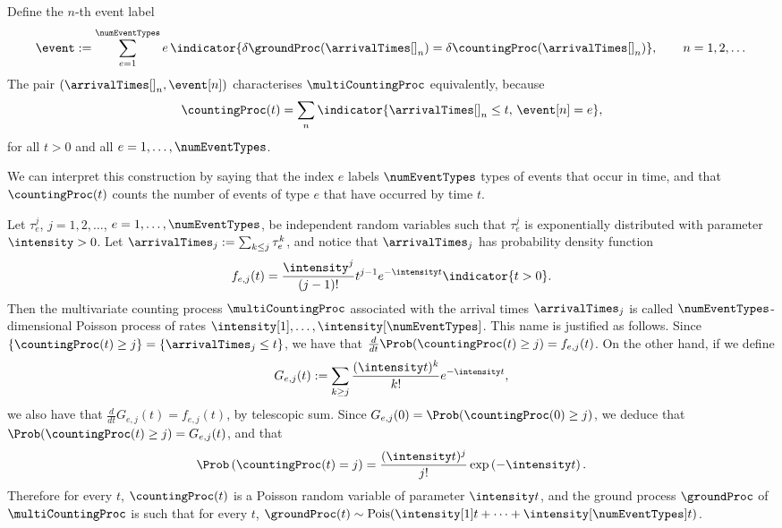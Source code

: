 Define the $n$-th event label
\begin{equation}
 \label{eq.eventLabels}
 \event := \sum_{e=1}^{\numEventTypes} e \,
 \indicator{\delta \groundProc(\arrivalTimes[ ]_{n}) = \delta\countingProc(\arrivalTimes[ ]_{n})},
 \qquad n = 1, 2, \dots
\end{equation}
The pair $(\arrivalTimes[ ]_{n}, \event[n])$ characterises $\multiCountingProc$ equivalently,
because
\begin{equation}\label{eq.NTE_counting_proc}
 \countingProc(t) = \sum_{n} \indicator{\arrivalTimes[ ]_{n}\leq t, \, \event[n] = e},
\end{equation}
for all $t>0$ and all $e = 1,\dots, \numEventTypes$.

We can interpret this construction by saying that the index $e$ labels $\numEventTypes$ types
of events that occur in time,
and that $\countingProc(t)$ counts the number of events of type $e$ that have occurred by time $t$.

\begin{example}
 Let $\tau_e^j$, $j = 1,2,\dots$, $e = 1,\dots, \numEventTypes$, be independent random variables
 such that $\tau_e^j$ is exponentially distributed with parameter $\intensity>0$.
 Let $\arrivalTimes_{j} := \sum_{k\leq j} \tau_e^{k}$,
 and notice that $\arrivalTimes_{j}$ has probability density function
 \begin{equation*}
  f_{e,j}(t) = \frac{\intensity^j}{(j-1)!}t^{j-1} e^{-\intensity t} \indicator{t>0}.
 \end{equation*}
 Then the multivariate counting process $\multiCountingProc$ associated with the arrival times
 $\arrivalTimes_{j}$ is called $\numEventTypes$-dimensional Poisson process of rates
 $\intensity[1], \dots, \intensity[\numEventTypes]$.
 This name is justified as follows.
 Since $\lbrace \countingProc(t)\geq j\rbrace = \lbrace \arrivalTimes_{j} \leq t\rbrace$,
 we have that $\frac{d}{dt} \Prob(\countingProc(t) \geq j) = f_{e,j} (t)$.
 On the other hand, if we define
 \begin{equation*}
  G_{e,j}(t) := \sum_{k\geq j} \frac{(\intensity t)^k}{k!}e^{-\intensity t},
 \end{equation*}
 we also have that $\frac{d}{dt} G_{e,j}(t) = f_{e,j}(t)$, by telescopic sum.
 Since $G_{e,j}(0) = \Prob (\countingProc(0)\geq j)$,
 we deduce that $\Prob(\countingProc(t) \geq j) = G_{e,j}(t)$, and that
 \begin{equation*}
  \Prob\left( \countingProc(t) = j\right) =
  \frac{(\intensity t)^j}{j!} \exp\left( -\intensity t\right).
 \end{equation*}
 Therefore for every $t$, $\countingProc(t)$ is a Poisson random variable of parameter
 $\intensity t$,
 and the ground process $\groundProc$ of $\multiCountingProc$ is such that for every $t$,
 $\groundProc(t) \sim \text{Pois}(\intensity[1]t + \dots + \intensity[\numEventTypes]t)$.
\end{example}

